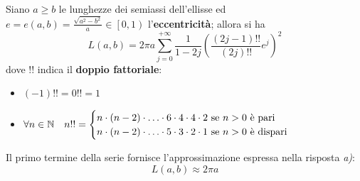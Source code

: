 \begin{theorema}
	Siano $a\geq b$ le lunghezze dei semiassi dell'ellisse ed $e=e\left(a,b\right)=\frac{\sqrt{a^2-b^2}}{a}\in\left[0,1\right)$ l'\textbf{eccentricità}; allora si ha
	\begin{equation}
		L\left(a,b\right)=2\pi a\sum_{j=0}^{+\infty}\frac{1}{1-2j}\left(\frac{\left(2j-1\right)!!}{\left(2j\right)!!}e^j\right)^2
	\end{equation}
dove $!!$ indica il \textbf{doppio fattoriale}:
\begin{itemize}
	\item $\left(-1\right)!!=0!!=1$
	\item $\forall n\in\mathbb{N}\quad n!!=\begin{cases}
		n\cdot \left(n-2\right)\cdot \ldots \cdot 6 \cdot 4 \cdot 4 \cdot 2\text{ se }n>0\text{ è pari}\\
		n\cdot \left(n-2\right)\cdot \ldots \cdot 5 \cdot 3 \cdot 2 \cdot 1\text{ se }n>0\text{ è dispari}\\
	\end{cases}$
\end{itemize}
\end{theorema}
Il primo termine della serie fornisce l'approssimazione espressa nella risposta \textit{a)}:
\begin{equation*}
	L\left(a,b\right)\approx 2\pi a
\end{equation*}
